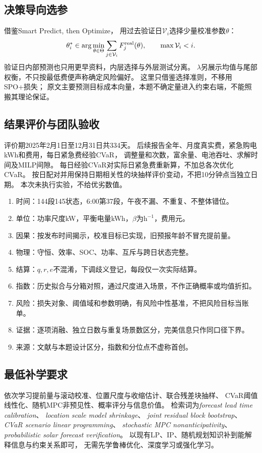 \documentclass[UTF8,11pt]{ctexart}
\begin{document}
\subsection{决策导向选参}
借鉴Smart Predict, then Optimize\cite{elmachtoub2022}，
用过去验证日$\mathcal V_i$选择少量校准参数$\theta$：
\begin{equation}
 \theta_i^*\in\arg\min_{\theta\in\Theta}
 \sum_{j\in\mathcal V_i}F_j^{\rm real}(\theta),\qquad\max\mathcal V_i<i.
\end{equation}
验证日内部预测也只用更早资料，内层选择与外层测试分离。
$\lambda$另展示均值与尾部权衡，不只按最低费便声称确定风险偏好。
这里只借鉴选择准则，不移用SPO+损失；
原文主要预测目标成本向量，本题不确定量进入约束右端，不能照搬其理论保证。

\subsection{结果评价与团队验收}
评价期2025年2月1日至12月31日共334天。
后续报告全年、月度真实费，紧急购电kWh和费用，每日紧急费经验CVaR，
调整量和次数，富余量、电池吞吐、求解时间及MILP间隙。
每日经验CVaR对实际日紧急费重新算，不加总各次优化CVaR。
按日配对并用保持日期相关性的块抽样评价变动，不把10分钟点当独立日期。
本次未执行实验，不给优劣数值。
\begin{enumerate}
 \item 时间：144段145状态，6:00第37段，午夜不漏、不重复、不整体错位。
 \item 单位：功率尺度kW，平衡电量kWh，$\beta$为$\mathrm h^{-1}$，费用元。
 \item 因果：按发布时间揭示，校准目标已实现，旧预报年龄不冒充提前量。
 \item 物理：守恒、效率、SOC、功率、互斥与跨日状态完整。
 \item 结算：$q,r,e$不混淆，下调歧义登记，每段仅一次实际结算。
 \item 指数：历史拟合与分箱对照，通过尺度进入场景，不作正确概率或均值折扣。
 \item 风险：损失对象、阈值域和参数明确，有风险中性基准，不把风险目标当账单。
 \item 证据：逐项消融、独立日数与重复场景数区分，完美信息只作同口径下界。
 \item 来源：文献与本题设计区分，指数和分位点不虚称首创。
\end{enumerate}

\subsection{最低补学要求}
依次学习提前量与滚动校准、位置尺度与收缩估计、联合残差块抽样、
CVaR阈值线性化、随机MPC非预见性、概率评分与信息价值。
检索词为\emph{forecast lead time calibration}、
\emph{location scale model shrinkage}、
\emph{joint residual block bootstrap}、
\emph{CVaR scenario linear programming}、
\emph{stochastic MPC nonanticipativity}、
\emph{probabilistic solar forecast verification}。
以现有LP、IP、随机规划知识补到能解释信息与约束关系即可，
无需先学鲁棒优化、深度学习或强化学习。
\end{document}

